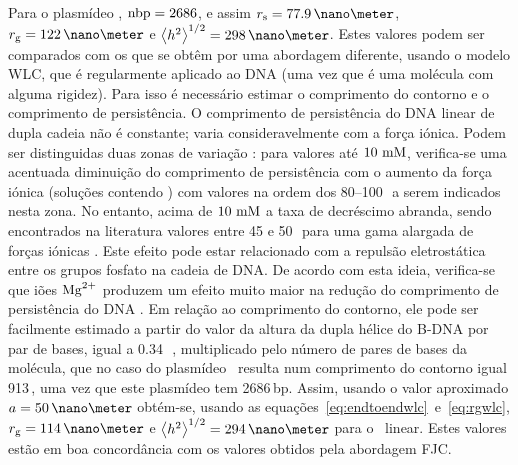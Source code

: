 Para o plasmídeo \pUC, $\mathrm{nbp}=2686$, e assim $\raiostokes=77.9\,\nano\meter$, $\raiogiracao=122\,\nano\meter$ e $\distanciah=298\,\nano\meter$. 
%
%
%
%
Estes valores podem ser comparados com os que se obtêm por uma abordagem diferente, usando o modelo WLC, que é regularmente aplicado ao DNA (uma vez que é uma molécula com alguma rigidez). Para isso é necessário estimar o comprimento do contorno e o comprimento de persistência. O comprimento de persistência do DNA linear de dupla cadeia não é constante; varia consideravelmente com a força iónica.
%
%
%
Podem ser distinguidas duas zonas de variação \cite{hagerman}: para valores até $10\,\mathrm{\,mM}$, verifica-se uma acentuada diminuição do comprimento de persistência com o aumento da força iónica (soluções contendo ) com valores na ordem dos 80--100\,\nano\meter\ a serem indicados nesta zona. No entanto, acima de $10\,\mathrm{\,mM}$ a taxa de decréscimo abranda, sendo encontrados na literatura valores entre 45 e 50\,\nano\meter\ para uma gama alargada de forças iónicas \cite{latu07,hagerman,bouchiat,chirico,zakharova}. Este efeito pode estar relacionado com a repulsão eletrostática entre os grupos fosfato na cadeia de DNA.
%
%
%
De acordo com esta ideia, verifica-se que iões $\mathrm{Mg}^{2+}$ produzem um efeito muito maior na redução do comprimento de persistência do DNA \cite{hagerman}.
%
Em relação ao comprimento do contorno, ele pode ser facilmente estimado a partir do valor da altura da dupla hélice do B-DNA por par de bases, igual a 0.34\,\nano\meter\ \cite{voet}, multiplicado pelo número de pares de bases da molécula, que no caso do plasmídeo \pUC\ resulta num comprimento do contorno igual 913\,\nano\meter, uma vez que este plasmídeo tem 2686\,bp.
%
%
%
%
%
Assim, usando o valor aproximado $\persis=50\,\nano\meter$ obtém-se, usando as equações~\ref{eq:endtoendwlc}~e~\ref{eq:rgwlc}, $\raiogiracao=114\,\nano\meter$ e $\distanciah=294\,\nano\meter$ para o \pUC\ linear. Estes valores estão em boa concordância com os valores obtidos pela abordagem FJC.

